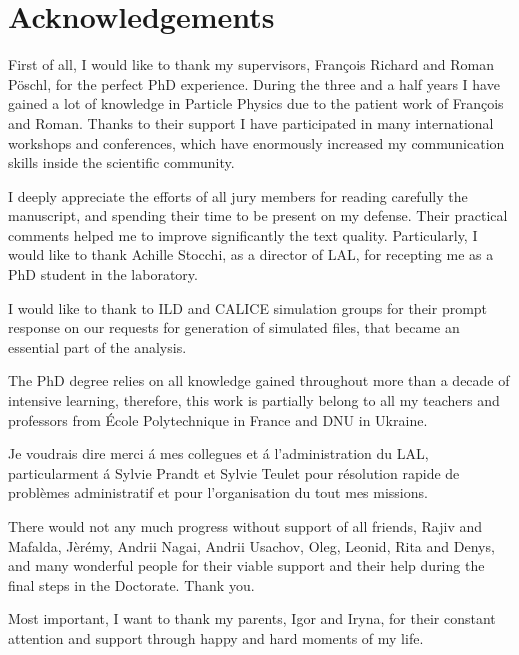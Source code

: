\section*{Acknowledgements}
First of all, I would like to thank my supervisors, Fran\c cois Richard and Roman P\"oschl, for the perfect PhD experience. 
During the three and a half years I have gained a lot of knowledge in Particle Physics due to the patient work of Fran\c cois and Roman. 
Thanks to their support I have participated in many international workshops and conferences, which have enormously increased my communication skills inside the scientific community. 


I deeply appreciate the efforts of all jury members for reading carefully the manuscript, and spending their time to be present on my defense. Their practical comments helped me to improve significantly the text quality. 
Particularly, I would like to thank Achille Stocchi, as a director of LAL, for  recepting me as a PhD student in the laboratory.

I would like to thank to ILD and CALICE simulation groups for their prompt response on our requests for generation of simulated files, that became an essential part of the analysis. 

The PhD degree relies on all knowledge gained throughout more than a decade of intensive learning, therefore, this work is partially belong to all my teachers and professors from \'Ecole Polytechnique in France and DNU in Ukraine. 

Je voudrais dire merci \'a mes collegues et \'a l'administration du LAL, particularment \'a Sylvie Prandt et Sylvie Teulet pour résolution rapide de problèmes administratif et pour l'organisation du tout mes missions.

There would not any much progress without support of all friends, Rajiv and Mafalda, J\`er\'emy, Andrii Nagai, Andrii Usachov, Oleg, Leonid, Rita and Denys, and many wonderful people for their viable support and their help during the final steps in the Doctorate. Thank you. 

Most important, I want to thank my parents, Igor and Iryna, for their constant attention and support through happy and hard moments of my life.  